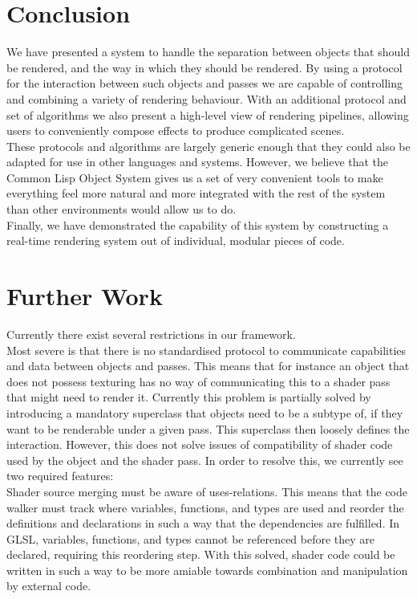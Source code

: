 \documentclass[format=sigconf]{acmart}
\begin{document}
\section{Conclusion}\label{conclusion}
We have presented a system to handle the separation between objects that should be rendered, and the way in which they should be rendered. By using a protocol for the interaction between such objects and passes we are capable of controlling and combining a variety of rendering behaviour. With an additional protocol and set of algorithms we also present a high-level view of rendering pipelines, allowing users to conveniently compose effects to produce complicated scenes. \\

These protocols and algorithms are largely generic enough that they could also be adapted for use in other languages and systems. However, we believe that the Common Lisp Object System gives us a set of very convenient tools to make everything feel more natural and more integrated with the rest of the system than other environments would allow us to do. \\

Finally, we have demonstrated the capability of this system by constructing a real-time rendering system out of individual, modular pieces of code.

\section{Further Work}\label{further-work}
Currently there exist several restrictions in our framework. \\

Most severe is that there is no standardised protocol to communicate capabilities and data between objects and passes. This means that for instance an object that does not possess texturing has no way of communicating this to a shader pass that might need to render it. Currently this problem is partially solved by introducing a mandatory superclass that objects need to be a subtype of, if they want to be renderable under a given pass. This superclass then loosely defines the interaction. However, this does not solve issues of compatibility of shader code used by the object and the shader pass. In order to resolve this, we currently see two required features: \\

Shader source merging must be aware of uses-relations. This means that the code walker must track where variables, functions, and types are used and reorder the definitions and declarations in such a way that the dependencies are fulfilled. In GLSL, variables, functions, and types cannot be referenced before they are declared, requiring this reordering step. With this solved, shader code could be written in such a way to be more amiable towards combination and manipulation by external code. \\
\end{document}
